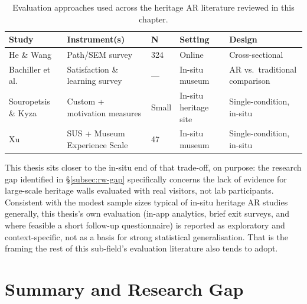 \begin{table}[h]
\centering
\caption{Evaluation approaches used across the heritage AR literature
reviewed in this chapter.}
\label{tab:evaluation-methods}
\small
\begin{tabular}{p{2.6cm}p{2.6cm}p{1.6cm}p{2.2cm}p{3.4cm}}
\toprule
\textbf{Study} & \textbf{Instrument(s)} & \textbf{N} & \textbf{Setting} & \textbf{Design} \\
\midrule
He \& Wang \cite{hewang2025} & Path/SEM survey & 324 & Online & Cross-sectional \\
Bachiller et al.\ \cite{bachiller2023} & Satisfaction \& learning survey & --- & In-situ museum & AR vs.\ traditional comparison \\
Souropetsis \& Kyza \cite{souropetsis2025} & Custom + motivation measures & Small & In-situ heritage site & Single-condition, in-situ \\
Xu \cite{xu2026chinatown} & SUS + Museum Experience Scale & 47 & In-situ museum & Single-condition, in-situ \\
\bottomrule
\end{tabular}
\end{table}

This thesis sits closer to the in-situ end of that trade-off, on
purpose: the research gap identified in \S\ref{subsec:rw-gap}
specifically concerns the lack of evidence for large-scale heritage walls
evaluated with real visitors, not lab participants. Consistent with
the modest sample sizes typical of in-situ heritage AR studies generally,
this thesis's own evaluation (in-app analytics, brief exit surveys, and where feasible a short follow-up questionnaire) is reported as
exploratory and context-specific, not as a basis for strong
statistical generalisation. That is the framing the rest of this
sub-field's evaluation literature also tends to adopt.

















\section{Summary and Research Gap}
\label{sec:rw-summary}

